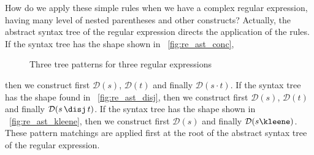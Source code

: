 How do we apply these simple rules when we have a complex regular
expression, having many level of nested parentheses and other
constructs? Actually, the abstract syntax tree of the regular
expression directs the application of the rules. If the syntax tree
has the shape shown in \fig~\vref{fig:re_ast_conc},
\begin{figure}[b]
\centering
{}
\qquad
{}
\qquad
{}
\caption{Three tree patterns for three regular expressions}
\end{figure}
then we construct first \(\mathcal{D}(s)\), \(\mathcal{D}(t)\) and
finally \(\mathcal{D}(s \cdot t)\). If the syntax tree has the shape
found in \fig~\vref{fig:re_ast_disj}, then we construct first
\(\mathcal{D}(s)\), \(\mathcal{D}(t)\) and finally \(\mathcal{D} (s
\, \text{\disj} \, t)\). If the syntax tree has the shape shown in
\fig~\vref{fig:re_ast_kleene}, then we construct first \({\mathcal
  D}(s)\) and finally \(\mathcal{D}(s\text{\kleene})\). These pattern
matchings are applied first at the root of the abstract syntax tree of
the regular expression.
